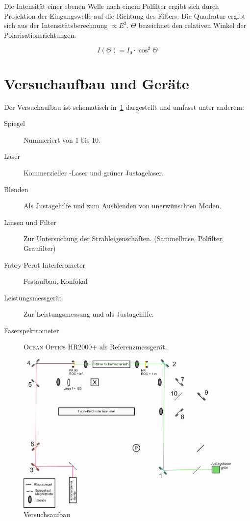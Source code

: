 \documentclass[slug=GL, room=HZDR\ Dresden/Rossendorf\,\ Geb.\ 620/123, supervisor=Tim\ Ziegler]{../../Lab_Report_LaTeX/lab_report}
\newcommand{\hne}{\ce{HeNe}-Laser}
\begin{document}
Die Intensit\"at einer ebenen Welle nach einem Polfilter ergibt sich
durch Projektion der Eingangswelle auf die Richtung des Filters. Die
Quadratur ergibt sich aus der Intensit\"atsberechnung \(\propto
E^2\). \(\Theta\) bezeichnet den relativen Winkel der
Polarisationsrichtungen.

\begin{equation}
  \label{eq:malus}
  I(\Theta)=I_0\cdot \cos^2{\Theta}
\end{equation}

\section{Versuchaufbau und Ger\"ate}
\label{sec:versuaufb}

Der Versuchaufbau ist schematisch in~\ref{fig:aufb} dargestellt und umfasst unter anderem:

\begin{description}
\item[Spiegel] Nummeriert von 1 bis 10.
\item[Laser] Kommerzieller \hne{} und gr\"uner Justagelaser.
\item[Blenden] Als Justagehilfe und zum Ausblenden von unerw\"unschten Moden.
\item[Linsen und Filter] Zur Untersuchung der Strahleigenschaften. (Sammellinse, Polfilter, Graufilter)
\item[Fabry Perot Interferometer] Festaufbau, Konfokal
\item[Leistungsmessger\"at] Zur Leistungsmessung und als Justagehilfe.
\item[Faserspektrometer] \textsc{Ocean Optics HR2000+} als Referenzmessger\"at.
\end{description}


\begin{figure}[H]\centering
  \includegraphics[width=.5\columnwidth]{aufb.png}
  \caption[Aufbau]{Versuchsaufbau}
  \label{fig:aufb}
\end{figure}
\end{document}
